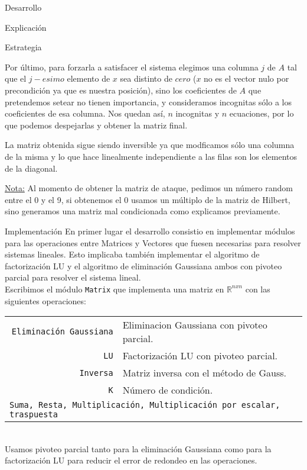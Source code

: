 \begin{section}{Desarrollo}
\begin{subsection}{Explicación}
\begin{subsubsection}{Estrategia}
\begin{enumerate}
			Por último, para forzarla a satisfacer el sistema elegimos una columna $j$ de $A$ tal que el $j-esimo$ elemento de $x$ sea distinto de $cero$ ($x$ no es el vector nulo por precondición ya que es nuestra posición), sino los coeficientes de $A$ que pretendemos setear no tienen importancia, y consideramos incognitas sólo a los coeficientes de esa columna. Nos quedan así, $n$ incognitas y $n$ ecuaciones, por lo que podemos despejarlas y obtener la matriz final.
			
			La matriz obtenida sigue siendo inversible ya que modficamos sólo una columna de la misma y lo que hace linealmente independiente a las filas son los elementos de la diagonal.
			
			\underline{Nota:} Al momento de obtener la matriz de ataque, pedimos un número random entre el 0 y el 9, si obtenemos el 0 usamos un múltiplo de la matriz de Hilbert, sino generamos una matriz mal condicionada como explicamos previamente.
			\end{enumerate}
		\end{subsubsection}
	\end{subsection}
	\begin{subsection}{Implementación}
		En primer lugar el desarrollo consistio en implementar módulos para las operaciones entre Matrices y Vectores que fuesen necesarias para resolver sistemas lineales. Esto implicaba también implementar el algoritmo de factorización LU y el algoritmo de eliminación Gaussiana ambos con pivoteo parcial para resolver el sistema lineal.\\
		
		Escribimos el módulo \texttt{Matrix} que implementa una matriz en $\mathbb{R}^{nxn}$ con las siguientes operaciones:\\
		
		\begin{tabular}{rl}
			\texttt{Eliminación Gaussiana} & Eliminacion Gaussiana con pivoteo parcial.\\
			\texttt{LU} & Factorización LU con pivoteo parcial.\\
			\texttt{Inversa} & Matriz inversa con el método de Gauss.\\
			\texttt{K} & Número de condición.\\
			\multicolumn{2}{l}{
				\texttt{Suma, Resta, Multiplicación, Multiplicación por escalar, traspuesta}
			}
		\end{tabular}\\
		
		Usamos pivoteo parcial tanto para la eliminación Gaussiana como para la factorización LU para reducir el error de redondeo en las operaciones.\\
		

\end{subsection}
\end{section}
